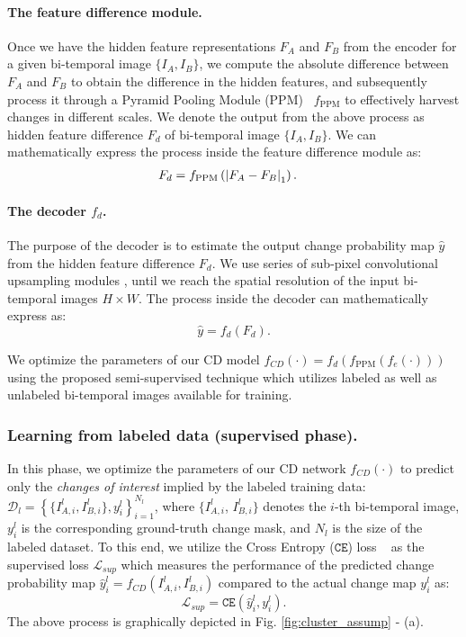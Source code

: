 \documentclass[runningheads]{llncs}
\begin{document}
\paragraph{The feature difference module.} Once we have the hidden feature representations $F_A$ and $F_B$ from the encoder for a given bi-temporal image $\{I_A, I_B\}$, we compute the absolute difference between $F_A$ and $F_B$ to obtain the difference in the hidden features, and subsequently process it through a Pyramid Pooling Module (PPM)~\cite{zhao2017pyramid} $f_{\text{PPM}}$ to effectively harvest changes in different scales. We denote the output from the above process as hidden feature difference $F_d$ of bi-temporal image $\{I_A, I_B\}$. We can mathematically express the process inside the feature difference module  as:
\begin{align}
    F_d &= f_{\text{PPM}} \left( \abs{F_A - F_B}_1 \right).
\end{align}
\paragraph{The decoder $f_d$.} The purpose of the decoder is to estimate the output change probability map $\hat{y}$ from the hidden feature difference $F_d$. We use series of sub-pixel convolutional upsampling modules \cite{shi2016real}, until we reach the spatial resolution of the input bi-temporal images $H \times W$. The process inside the decoder can mathematically express as:
\begin{equation}
    \hat{y} = f_d(F_d).
\end{equation}

We optimize the parameters of our CD model $f_{CD}(\cdot) = f_d(f_{\text{PPM}}(f_e(\cdot)))$ using the proposed semi-supervised technique which utilizes labeled as well as unlabeled bi-temporal images available for training. 

\subsubsection{Learning from labeled data (supervised phase).} In this phase, we optimize the parameters of our CD network $f_{CD}(\cdot)$ to predict only the \textit{changes of interest} implied by the labeled training data: $\mathcal{D}_{l} = \left\{ \{I_{A,i}^l, I_{B,i}^l\}, y_{i}^l \right\}_{i=1}^{N_l} $, where $\{I_{A,i}^l$, $I_{B,i}^l\}$ denotes the $i$-th bi-temporal image, $y_{i}^l$ is the corresponding ground-truth change mask, and $N_l$ is the size of the labeled dataset.  To this end, we utilize the Cross Entropy ($\texttt{CE}$) loss ~\cite{murphy2012machine} as the supervised loss $\mathcal{L}_{sup}$ which measures the performance of the predicted change probability map $\hat{y}_{i}^l = f_{CD}(I_{A,i}^l, I_{B,i}^l)$ compared to the actual change map $y^l_{i}$ as:
\begin{equation}
    \mathcal{L}_{sup} = \texttt{CE}(\hat{y}_{i}^l, y^l_{i}).
\end{equation}
The above process is graphically depicted in Fig. \ref{fig:cluster_assump} - (a).
\end{document}
